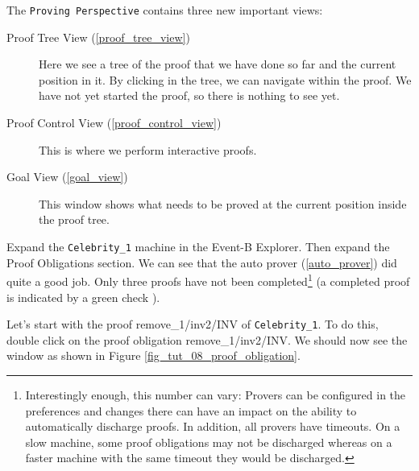 The \texttt{Proving Perspective} contains three new important views:

\begin{description}
	\item[Proof Tree View (\ref{proof_tree_view})] Here we see a tree of the proof that we have done so far and the current position in it. By clicking in the tree, we can navigate within the proof. We have not yet started the proof, so there is nothing to see yet.
	\item[Proof Control View (\ref{proof_control_view})] This is where we perform interactive proofs.
	\item[Goal View (\ref{goal_view})] This window shows what needs to be proved at the current position inside the proof tree.
\end{description}

Expand the \texttt{Celebrity\_1} machine in the \textsf{Event-B Explorer}. Then expand the \textsf{Proof Obligations} section. We can see that the auto prover (\ref{auto_prover}) did quite a good job. Only three proofs have not been completed\footnote{Interestingly enough, this number can vary: Provers can be configured in the preferences and changes there can have an impact on the ability to automatically discharge proofs.  In addition, all provers have timeouts.  On a slow machine, some proof obligations may not be discharged whereas on a faster machine with the same timeout they would be discharged.}  (a completed proof is indicated by a green check ). 


Let's start with the proof \textsf{remove\_1/inv2/INV} of \texttt{Celebrity\_1}.
To do this, double click on the proof obligation \textsf{remove\_1/inv2/INV}.
We should now see the window as shown in Figure \ref{fig_tut_08_proof_obligation}.



